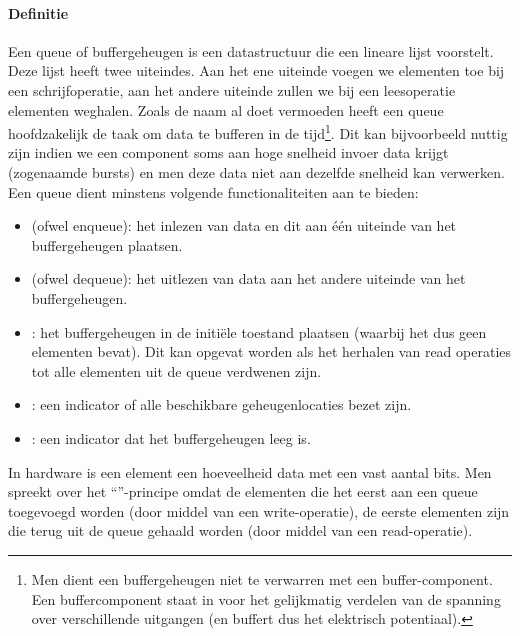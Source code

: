 \paragraph{Definitie}Een queue of buffergeheugen is een datastructuur die een lineare lijst voorstelt. Deze lijst heeft twee uiteindes. Aan het ene uiteinde voegen we elementen toe bij een schrijfoperatie, aan het andere uiteinde zullen we bij een leesoperatie elementen weghalen. Zoals de naam al doet vermoeden heeft een queue hoofdzakelijk de taak om data te bufferen in de tijd\footnote{Men dient een buffergeheugen niet te verwarren met een buffer-component. Een buffercomponent staat in voor het gelijkmatig verdelen van de spanning over verschillende uitgangen (en buffert dus het elektrisch potentiaal).}. Dit kan bijvoorbeeld nuttig zijn indien we een component soms aan hoge snelheid invoer data krijgt (zogenaamde bursts) en men deze data niet aan dezelfde snelheid kan verwerken. Een queue dient minstens volgende functionaliteiten aan te bieden:
\begin{itemize}
 \item {} (ofwel enqueue): het inlezen van data en dit aan \'e\'en uiteinde van het buffergeheugen plaatsen.
 \item {} (ofwel dequeue): het uitlezen van data aan het andere uiteinde van het buffergeheugen.
 \item {}: het buffergeheugen in de initi\"ele toestand plaatsen (waarbij het dus geen elementen bevat). Dit kan opgevat worden als het herhalen van read operaties tot alle elementen uit de queue verdwenen zijn.
 \item {}: een indicator of alle beschikbare geheugenlocaties bezet zijn.
 \item {}: een indicator dat het buffergeheugen leeg is.
\end{itemize}
In hardware is een element een hoeveelheid data met een vast aantal bits. Men spreekt over het ``''-principe omdat de elementen die het eerst aan een queue toegevoegd worden (door middel van een write-operatie), de eerste elementen zijn die terug uit de queue gehaald worden (door middel van een read-operatie).
